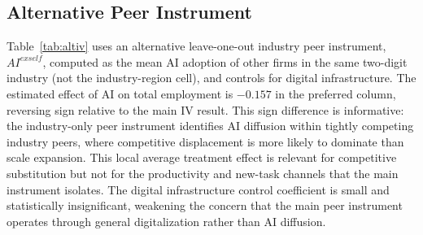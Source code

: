 \documentclass[12pt,a4paper]{article}
\theoremstyle{predstyle}
\theoremstyle{plain}
\begin{document}
\subsection{Alternative Peer Instrument}
\label{sec:altiv}

Table~\ref{tab:altiv} uses an alternative leave-one-out industry peer instrument, \(AI^{exself}\), computed as the mean AI adoption of other firms in the same two-digit industry (not the industry-region cell), and controls for digital infrastructure. The estimated effect of AI on total employment is \(-0.157\) in the preferred column, reversing sign relative to the main IV result. This sign difference is informative: the industry-only peer instrument identifies AI diffusion within tightly competing industry peers, where competitive displacement is more likely to dominate than scale expansion. This local average treatment effect is relevant for competitive substitution but not for the productivity and new-task channels that the main instrument isolates. The digital infrastructure control coefficient is small and statistically insignificant, weakening the concern that the main peer instrument operates through general digitalization rather than AI diffusion.
\end{document}

